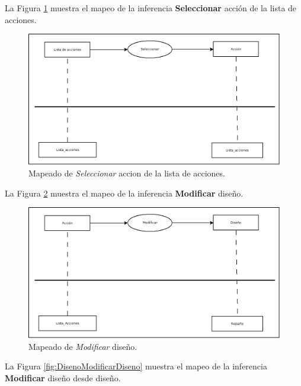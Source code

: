 La Figura \ref{fig:ListaAccionesSeleccionarAccion} muestra el mapeo de la inferencia \textbf{Seleccionar} acción de la lista de acciones.

\begin{figure}[H]
  \centering
  \includegraphics[scale=0.35]{imaxes/ListaAccionesSeleccionarAccion.png}
  \caption{\label{fig:ListaAccionesSeleccionarAccion}Mapeado de \textit{Seleccionar} accion de la lista de acciones.}
\end{figure}

La Figura \ref{fig:AccionModificaDiseno} muestra el mapeo de la inferencia \textbf{Modificar} diseño.

\begin{figure}[H]
  \centering
  \includegraphics[scale=0.35]{imaxes/AccionModificaDiseno.png}
  \caption{\label{fig:AccionModificaDiseno}Mapeado de \textit{Modificar} diseño.}
\end{figure}

La Figura \ref{fig:DisenoModificarDiseno} muestra el mapeo de la inferencia \textbf{Modificar} diseño desde diseño.

